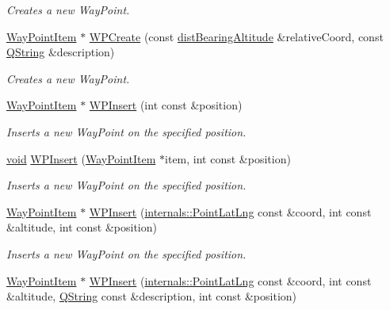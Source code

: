 \begin{DoxyCompactItemize}
\begin{DoxyCompactList}\small\item\em \-Creates a new \-Way\-Point. \end{DoxyCompactList}\item 
\hyperlink{classmapcontrol_1_1_way_point_item}{\-Way\-Point\-Item} $\ast$ \hyperlink{group___o_p_map_widget_ga950bec7a5d536f5adeddf3f2db2ee98f}{\-W\-P\-Create} (const \hyperlink{structmapcontrol_1_1dist_bearing_altitude}{dist\-Bearing\-Altitude} \&relative\-Coord, const \hyperlink{group___u_a_v_objects_plugin_gab9d252f49c333c94a72f97ce3105a32d}{\-Q\-String} \&description)
\begin{DoxyCompactList}\small\item\em \-Creates a new \-Way\-Point. \end{DoxyCompactList}\item 
\hyperlink{classmapcontrol_1_1_way_point_item}{\-Way\-Point\-Item} $\ast$ \hyperlink{group___o_p_map_widget_ga44d46fc77045a7ac6011ebda19204c43}{\-W\-P\-Insert} (int const \&position)
\begin{DoxyCompactList}\small\item\em \-Inserts a new \-Way\-Point on the specified position. \end{DoxyCompactList}\item 
\hyperlink{group___u_a_v_objects_plugin_ga444cf2ff3f0ecbe028adce838d373f5c}{void} \hyperlink{group___o_p_map_widget_ga65a6a571d08fec807a20945e293acc73}{\-W\-P\-Insert} (\hyperlink{classmapcontrol_1_1_way_point_item}{\-Way\-Point\-Item} $\ast$item, int const \&position)
\begin{DoxyCompactList}\small\item\em \-Inserts a new \-Way\-Point on the specified position. \end{DoxyCompactList}\item 
\hyperlink{classmapcontrol_1_1_way_point_item}{\-Way\-Point\-Item} $\ast$ \hyperlink{group___o_p_map_widget_ga1b5b37540dd272a7b6f4a39ae12095a4}{\-W\-P\-Insert} (\hyperlink{structinternals_1_1_point_lat_lng}{internals\-::\-Point\-Lat\-Lng} const \&coord, int const \&altitude, int const \&position)
\begin{DoxyCompactList}\small\item\em \-Inserts a new \-Way\-Point on the specified position. \end{DoxyCompactList}\item 
\hyperlink{classmapcontrol_1_1_way_point_item}{\-Way\-Point\-Item} $\ast$ \hyperlink{group___o_p_map_widget_ga344e39ad3db8c1de32dda8273e78310e}{\-W\-P\-Insert} (\hyperlink{structinternals_1_1_point_lat_lng}{internals\-::\-Point\-Lat\-Lng} const \&coord, int const \&altitude, \hyperlink{group___u_a_v_objects_plugin_gab9d252f49c333c94a72f97ce3105a32d}{\-Q\-String} const \&description, int const \&position)

\end{DoxyCompactItemize}
